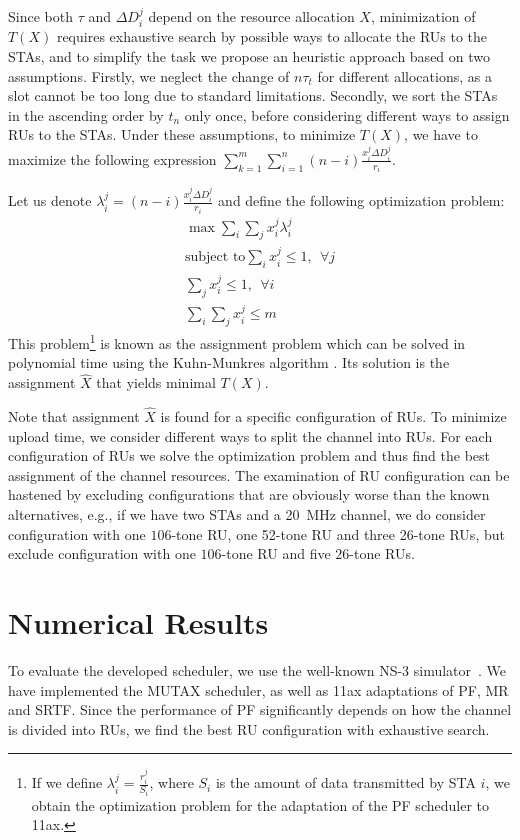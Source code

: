 Since both $\tau$ and  $\Delta D_i^j$ depend on the resource allocation $X$, minimization of $T(X)$ requires exhaustive search by possible ways to allocate the RUs to the STAs, and to simplify the task we propose an heuristic approach based on two assumptions.
Firstly, we neglect the change of $n \tau_t$ for different allocations, as a slot cannot be too long due to standard limitations.
Secondly, we sort the STAs in the ascending order by $t_n$ only once, before considering different ways to assign RUs to the STAs.
Under these assumptions, to minimize  $T(X)$, we have to maximize the following expression $\sum_{k = 1}^{m} \sum_{i = 1}^{n } \left(n - i\right) \frac{x_i^j \Delta D_i^j}{r_{i}}$.

Let us denote $\lambda_i^j = \left(n - i\right) \frac{x_i^j \Delta D_i^j}{r_{i}}$ and define the following optimization problem:
\begin{align*}
	\max \sum_{i} \sum_{j} x_i^j \lambda_i^j \\
	\text{subject to} \sum_{i} x_i^j \leq 1,\ \  \forall j \\
	\sum_{j} x_i^j \leq 1, \ \ \forall i \\
	\sum_{i} \sum_{j} x_i^j \leq m
\end{align*}
This problem\footnote{If we define $\lambda_i^j = \frac{r_i^j}{S_i}$, where $S_i$ is the amount of data transmitted by STA $i$, we obtain the optimization problem for the adaptation of the PF scheduler to 11ax.} is known as the assignment problem which can be solved in polynomial time using the Kuhn-Munkres algorithm \cite{bourgeois1971extension}.
Its solution is the assignment $\hat X$ that yields minimal $T(X)$.

Note that assignment $\hat X$ is found for a specific configuration of RUs.
To minimize upload time, we consider different ways to split the channel into RUs. For each configuration of RUs we solve the optimization problem and thus find the best assignment of the channel resources.
The examination of RU configuration can be hastened by excluding configurations that are obviously worse than the known alternatives, e.g., if we have two STAs and a \SI{20}{\MHz} channel, we do consider configuration with one $106$-tone RU, one 52-tone RU and three 26-tone RUs, but exclude configuration with one $106$-tone RU and five $26$-tone RUs.

\section{Numerical  Results}
To evaluate the developed scheduler, we use  the well-known NS-3 simulator~\cite{ns-3}.
We have implemented the MUTAX scheduler, as well as 11ax adaptations of PF, MR and SRTF.
Since the performance of PF significantly depends on how the channel is divided into RUs, we find the best RU configuration with exhaustive search.

